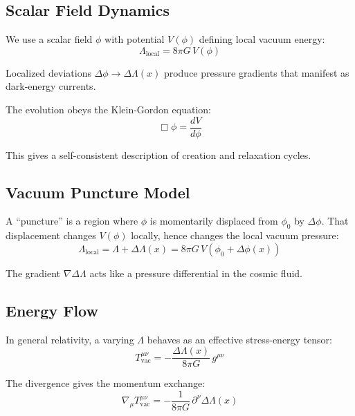 \documentclass[11pt,a4paper]{article}
\begin{document}
\subsection{Scalar Field Dynamics}

We use a scalar field $\phi$ with potential $V(\phi)$ defining local vacuum energy:
\begin{equation}
\Lambda_{\text{local}} = 8\pi G\,V(\phi)
\end{equation}

Localized deviations $\Delta\phi \rightarrow \Delta\Lambda(x)$ produce pressure gradients that manifest as dark-energy currents.

The evolution obeys the Klein-Gordon equation:
\begin{equation}
\Box\phi = \frac{dV}{d\phi}
\end{equation}

This gives a self-consistent description of creation and relaxation cycles.

\subsection{Vacuum Puncture Model}

A ``puncture'' is a region where $\phi$ is momentarily displaced from $\phi_0$ by $\Delta\phi$. That displacement changes $V(\phi)$ locally, hence changes the local vacuum pressure:
\begin{equation}
\Lambda_{\text{local}} = \Lambda + \Delta\Lambda(x) = 8\pi G\,V(\phi_0+\Delta\phi(x))
\end{equation}

The gradient $\nabla\Delta\Lambda$ acts like a pressure differential in the cosmic fluid.

\subsection{Energy Flow}

In general relativity, a varying $\Lambda$ behaves as an effective stress-energy tensor:
\begin{equation}
T^{\mu\nu}_{\text{vac}} = -\frac{\Delta\Lambda(x)}{8\pi G}\,g^{\mu\nu}
\end{equation}

The divergence gives the momentum exchange:
\begin{equation}
\nabla_\mu T^{\mu\nu}_{\text{vac}} = -\frac{1}{8\pi G}\,\partial^\nu\Delta\Lambda(x)
\end{equation}
\end{document}
